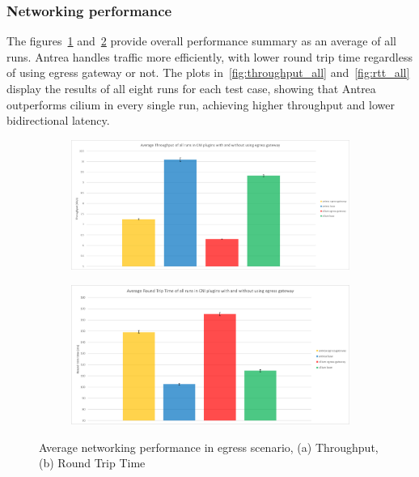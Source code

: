 \subsubsection{Networking performance}
\label{sec:egressNetworkingPerformance}

The figures~\ref{fig:throughput_avg} and~\ref{fig:rtt_avg} provide overall performance summary as an average of all runs. Antrea handles traffic more efficiently, with lower round trip time regardless of using egress gateway or not. The plots in~\ref{fig:throughput_all} and~\ref{fig:rtt_all} display the results of all eight runs for each test case, showing that Antrea outperforms cilium in every single run, achieving higher throughput and lower bidirectional latency.

\begin{figure}[H]
    \centering
    \begin{subfigure}[b]{0.7\textwidth}
        \includegraphics[width=\textwidth]{plots/egress/throughput_total_average.png}
        \caption{}
        \label{fig:throughput_avg}
    \end{subfigure}
    \begin{subfigure}[b]{0.7\textwidth}
        \includegraphics[width=\textwidth]{plots/egress/rtt_total_average.png}
        \caption{}
        \label{fig:rtt_avg}
    \end{subfigure}
    
    \caption{Average networking performance in egress scenario, (a) Throughput, (b) Round Trip Time}
    \label{fig:networking_avg}
\end{figure}

